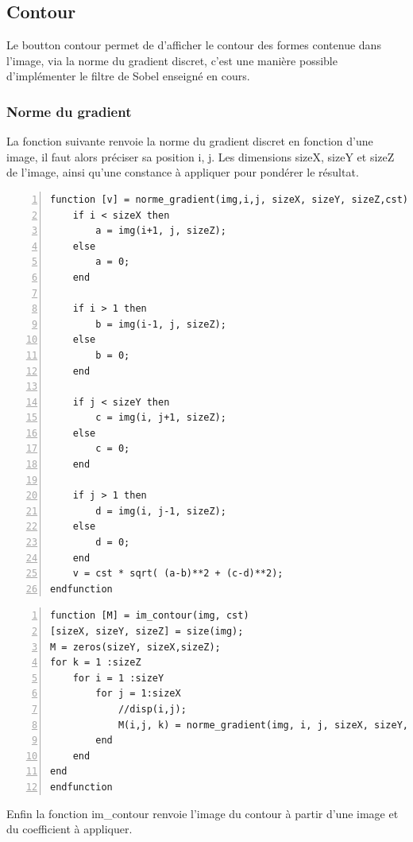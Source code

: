 \documentclass[12pt, letterpaper]{article}
\begin{document}
\subsection{Contour}
Le boutton contour permet de d'afficher le contour des formes contenue dans l'image, via la norme du gradient discret, 
c'est une manière possible d'implémenter le filtre de Sobel enseigné en cours.

\subsubsection{Norme du gradient}
La fonction suivante renvoie la norme du gradient discret en fonction d'une image, il faut alors préciser sa position i, j. 
Les dimensions sizeX, sizeY et sizeZ de l'image, ainsi qu'une constance à appliquer pour pondérer le résultat.

\begin{Verbatim}[numbers=left,xleftmargin = 5mm]
    function [v] = norme_gradient(img,i,j, sizeX, sizeY, sizeZ,cst)
    if i < sizeX then
        a = img(i+1, j, sizeZ);
    else
        a = 0;
    end
    
    if i > 1 then
        b = img(i-1, j, sizeZ);
    else
        b = 0;
    end

    if j < sizeY then
        c = img(i, j+1, sizeZ);
    else
        c = 0;
    end

    if j > 1 then
        d = img(i, j-1, sizeZ);
    else
        d = 0;
    end
    v = cst * sqrt( (a-b)**2 + (c-d)**2);
endfunction
\end{Verbatim}

\begin{Verbatim}[numbers=left,xleftmargin = 5mm]
function [M] = im_contour(img, cst)
[sizeX, sizeY, sizeZ] = size(img);
M = zeros(sizeY, sizeX,sizeZ);
for k = 1 :sizeZ
    for i = 1 :sizeY
        for j = 1:sizeX
            //disp(i,j);
            M(i,j, k) = norme_gradient(img, i, j, sizeX, sizeY, k, cst);
        end
    end
end
endfunction
\end{Verbatim}
Enfin la fonction im\_contour renvoie l'image du contour à partir d'une image et du coefficient à appliquer.
\end{document}
